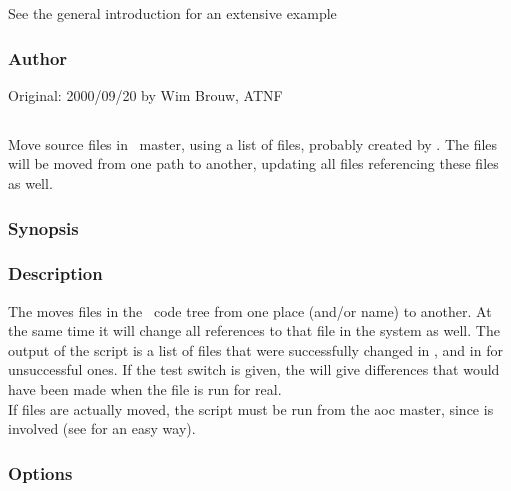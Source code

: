 \noindent
See the general introduction for an extensive example 

\subsubsection*{Author}

Original: 2000/09/20 by Wim Brouw, ATNF


\newpage

\subsection{}
\label{UPmove}

Move source files in \aipspp\ master, using a list of files, probably
created by . The files will be moved from one path to another,
updating all files referencing these files as well.

\subsubsection*{Synopsis}

\begin{synopsis}
\end{synopsis}

\subsubsection*{Description}

\noindent
The  moves files in the \aipspp\ code tree from one place (and/or 
name) to another. At the same time it will change all references to that file
in the system as well. The output of the script is a list of files that were
successfully changed in , and in  for
unsuccessful ones. If the  test switch is given, the
 will give differences that would have been made when the
file is run for real.\\
If files are actually moved, the script must be run from the aoc master,
since  is involved (see  for an easy way).

\subsubsection*{Options}

